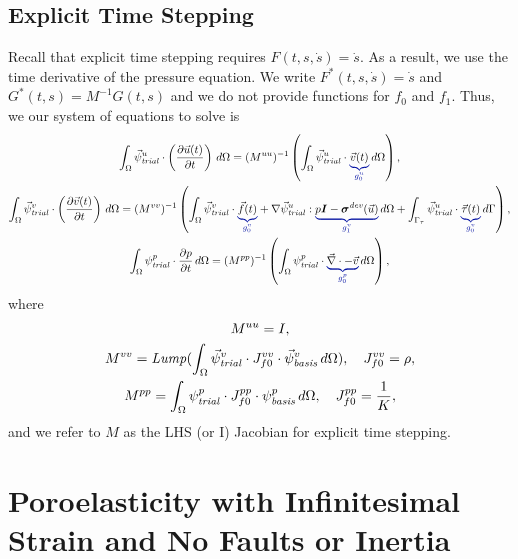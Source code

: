 \subsection{Explicit Time Stepping}
Recall that explicit time stepping requires
$F(t,s,\dot{s})=\dot{s}$. As a result, we use the time derivative of
the pressure equation. We write $F^*(t,s,\dot{s}) = \dot{s}$ and
$G^*(t,s) = M^{-1}G(t,s)$ and we do not provide functions for $f_0$
and $f_1$. Thus, we our system of equations to solve is
\begin{gather}
  \label{eqn:incompressibe:elasticity:velocity:explicit}
  \int_\Omega \trialvec[u] \cdot \left( \frac{\partial \vec{u}(t)}{\partial t} \right) \, 
d\Omega = 
  (M^{uu})^{-1} \left( \int_\Omega \trialvec[u] \cdot \eqnannotate{\vec{v}(t)}{g_0^u} \, 
d\Omega \right), \\
%
  \label{eqn:impcompressibe:elasticity:displacement:explicit}
  \int_\Omega \trialvec[v] \cdot \left( \frac{\partial \vec{v}(t)}{\partial t} \right) \, 
d\Omega =
  (M^{vv})^{-1} \left( \int_\Omega \trialvec[v] \cdot \eqnannotate{\vec{f}(t)}{g_0^v} + \nabla 
\trialvec[u] : 
\eqnannotate{p\tensor{I}-\tensor{\sigma}^\mathit{dev}(\vec{u})}{g_1^v} \, d\Omega + 
\int_{\Gamma_\tau} 
\trialvec[u] \cdot \eqnannotate{\vec{\tau}(t)}{g_0^v} \, d\Gamma \right), \\
%
  \label{eqn:incompressible:elasticity:pressure:explicit}
  \int_\Omega \trialscalar[p] \cdot \frac{\partial p}{\partial t} \, d\Omega = (M^{pp})^{-1} 
\left( \int_\Omega 
\trialscalar[p] \cdot \eqnannotate{\vec{\nabla} \cdot -\vec{v}}{g_0^p} \, d\Omega \right),
\end{gather}
where 
\begin{gather}
  M^{uu} = I, \\
  M^{vv} = \mathit{Lump}(\int_\Omega \trialvec[v] \cdot J_{f0}^{vv} \cdot \basisvec[v] \, 
d\Omega), \quad J_{f0}
^{vv} = \rho, \\
  M^{pp} = \int_\Omega \trialscalar[p] \cdot J_{f0}^{pp} \cdot \basisscalar[p] \, d\Omega, 
\quad J_{f0}^{pp} = 
\frac{1}{K}, \\
\end{gather}
and we refer to $M$ as the LHS (or I) Jacobian for explicit time stepping.


\section{Poroelasticity with Infinitesimal Strain and No Faults or Inertia}

